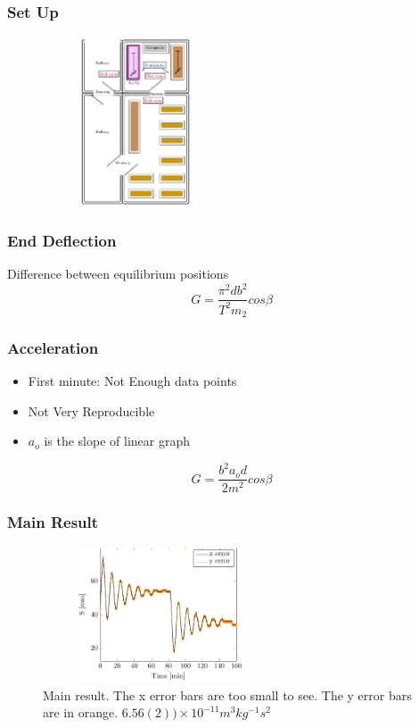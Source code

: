 \documentclass{beamer}
\begin{document}
\begin{frame}
\frametitle[Gravitational Constant]{Set Up}
   
   \centering
   \begin{figure}
\includegraphics[width=5.5cm, height=5cm]{images/map.png}
\label{fig:cab}
\end{figure}
\end{frame}


\begin{frame}
\frametitle[Gravitational Constant]{End Deflection}

 
   Difference between equilibrium positions
$$G=\frac{\pi^{2}{d}{b}^{2}}{T^{2}m_{2} }cos{\beta}$$

\end{frame}


\begin{frame}
\frametitle[Gravitational Constant]{Acceleration}
   \begin{itemize}
   \item  First minute: Not Enough data points
   \item  Not Very Reproducible 
   \item $a_{o}$ is the slope of linear graph
   \end{itemize}

$$G=\frac{b^2 a_{o} d}{ 2 m^{2}} cos\beta$$

\end{frame}



\begin{frame}
\frametitle[Gravitational Constant]{Main Result}

\begin{figure}[H]
\centering
\includegraphics[width=7cm, height=4cm]{graphs/mainresult}
\caption{Main result. The x error bars are too small to see. The y error bars are in orange. $6.56(2))\times{10}^{-11} m^{3}kg^{-1}s^{2}$}
\label{fig:mainresult}
\end{figure}
\end{frame}
\end{document}
